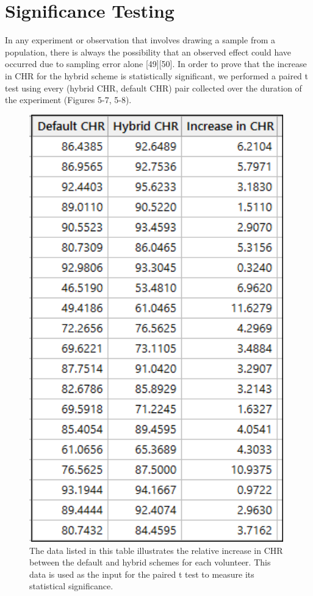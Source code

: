 \documentclass[12pt]{uthesis-v12}  %
\begin{document}
		\section{Significance Testing}
			In any experiment or observation that involves drawing a sample from a population, there is always the possibility that an observed effect could have occurred due to sampling error alone [49][50]. In order to prove that the increase in CHR for the hybrid scheme is statistically significant, we performed a paired t test using every (hybrid CHR, default CHR) pair collected over the duration of the experiment (Figures 5-7, 5-8).
			
			\begin{figure}[h]
				\centering
				\includegraphics[width = 110mm]{images/chrPairs.png}
				\caption[Relative Increase in CHR - Table]{The data listed in this table illustrates the relative increase in CHR between the default and hybrid schemes for each volunteer. This data is used as the input for the paired t test to measure its statistical significance.}
			\end{figure}
			
\end{document}
